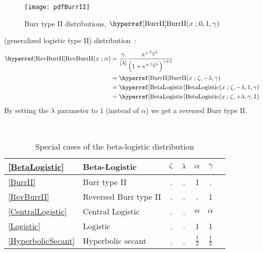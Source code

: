 \begin{figure}[t!]
\begin{center}
\texttt{[image: pdfBurrII]}
\end{center}
\caption[Burr II distributions]{Burr type II distributions, $\opr{BurrII}(x\given0,1,\gamma)$}
\end{figure}


 (generalized logistic type II) distribution~\cite{Johnson1994}:
\begin{align}
\label{RevBurrII}
\opr{RevBurrII}(x\given \alpha) 
& = \frac{\gamma}{|\pScale|}   \frac{e^{+ \frac{x-\pLoc}{\pScale} } } { \Left(1 + e^{+\frac{x-\pLoc}{\pScale}  }\Right)^{\gamma+1} }
\checked
\\
& = \opr{BurrII}(x\given \pLoc, -\pScale,  \gamma) \notag \checked \\
& = \opr{BetaLogistic}(x\given \pLoc, -\pScale, 1, \gamma) \notag \checked \\
& = \opr{BetaLogistic}(x\given \pLoc, +\pScale, \gamma, 1)  \notag \checked
\notag
\end{align}
By setting the $\lambda$ parameter to $1$ (instead of $\alpha$) we get a reversed Burr type II.


\begin{table*}[ptb] 
\begin{center}
\caption[Beta-logistic distribution -- Special cases]{Special cases of the beta-logistic distribution}
~\\
{\renewcommand{\arraystretch}{1.25} 
\begin{tabular}{llccccl}
\eqref{BetaLogistic} & Beta-Logistic & $\zeta$ & $\lambda$ & $\alpha$ &  $\gamma$ \\
\hline  
\eqref{BurrII} & Burr type II					&. & . & 1 & . & \\
\eqref{RevBurrII}& Reversed Burr type II		&	. & . & . & 1 &\\
\eqref{CentralLogistic}& Central Logistic		&	. &   . & $\alpha$ & $\alpha$ & \\
\eqref{Logistic}& Logistic					& 	. & . & 1 & 1 & \\
\eqref{HyperbolicSecant}& Hyperbolic secant	&	. & . & $\tfrac{1}{2}$ & $\tfrac{1}{2}$ & \\
\end{tabular}
}
\end{center}
\end{table*}





